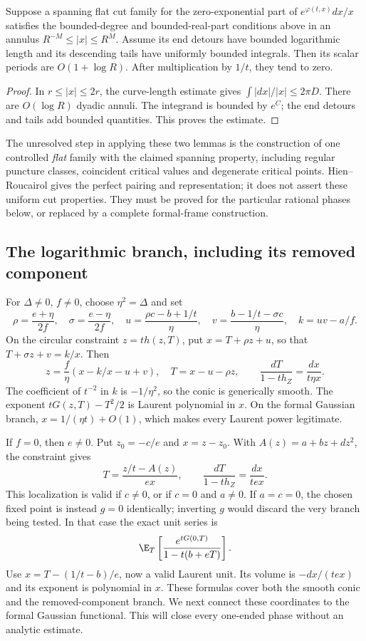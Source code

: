 \begin{lemma}\label{lem:conditionallog}
Suppose a spanning flat cut family for the zero-exponential part of
$e^{\varphi(t,x)}dx/x$ satisfies the bounded-degree and bounded-real-part
conditions above in an annulus $R^{-M}\leq|x|\leq R^M$. Assume its
end detours have bounded logarithmic length and its descending tails
have uniformly bounded integrals. Then its scalar periods are
$O(1+\log R)$. After multiplication by $1/t$, they tend to zero.
\end{lemma}
\begin{proof}
In $r\leq|x|\leq2r$, the curve-length estimate gives
$\int|dx|/|x|\leq2\pi D$. There are $O(\log R)$ dyadic annuli.
The integrand is bounded by $e^C$; the end detours and tails add
bounded quantities. This proves the estimate.
\end{proof}

The unresolved step in applying these two lemmas is the construction
of one controlled \emph{flat} family with the claimed spanning
property, including regular puncture classes, coincident critical
values and degenerate critical points. Hien--Roucairol gives the
perfect pairing and representation; it does not assert these uniform
cut properties. They must be proved for the particular rational
phases below, or replaced by a complete formal-frame construction.

\subsection{The logarithmic branch, including its removed component}

For $\Delta\ne0$, $f\ne0$, choose $\eta^2=\Delta$ and set
\[
 \rho=\frac{e+\eta}{2f},\quad \sigma=\frac{e-\eta}{2f},\quad
 u=\frac{\rho c-b+1/t}{\eta},\quad
 v=\frac{b-1/t-\sigma c}{\eta},\quad k=uv-a/f.
\]
On the circular constraint $z=th(z,T)$, put
$x=T+\rho z+u$, so that $T+\sigma z+v=k/x$. Then
\[
 z=\frac f\eta(x-k/x-u+v),\quad T=x-u-\rho z,
 \qquad
 \frac{dT}{1-th_Z}=\frac{dx}{t\eta x}.
\]
The coefficient of $t^{-2}$ in $k$ is $-1/\eta^2$, so the conic
is generically smooth. The exponent $tG(z,T)-T^2/2$ is Laurent
polynomial in $x$. On the formal Gaussian branch,
$x=1/(\eta t)+O(1)$, which makes every Laurent power legitimate.

If $f=0$, then $e\ne0$. Put $z_0=-c/e$ and $x=z-z_0$. With
$A(z)=a+bz+dz^2$, the constraint gives
\[
 T=\frac{z/t-A(z)}{ex},\qquad
 \frac{dT}{1-th_Z}=\frac{dx}{tex}.
\]
This localization is valid if $c\ne0$, or if $c=0$ and $a\ne0$.
If $a=c=0$, the chosen fixed point is instead $g=0$ identically;
inverting $g$ would discard the very branch being tested. In that
case the exact unit series is
\[
 \E_T\left[\frac{e^{tG(0,T)}}{1-t(b+eT)}\right].
\]
Use $x=T-(1/t-b)/e$, now a valid Laurent unit. Its volume is
$-dx/(tex)$ and its exponent is polynomial in $x$. These formulas
cover both the smooth conic and the removed-component branch.
We next connect these coordinates to the formal Gaussian functional.
This will close every one-ended phase without an analytic estimate.

